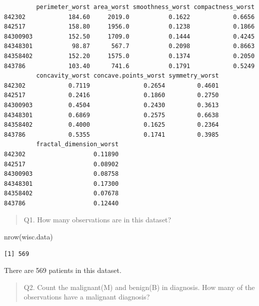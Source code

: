 \documentclass[
  letterpaper,
  DIV=11,
  numbers=noendperiod]{scrartcl}
\newenvironment{Shaded}{\begin{snugshade}}{\end{snugshade}}
\newcommand{\FunctionTok}[1]{\textcolor[rgb]{0.28,0.35,0.67}{#1}}
\newcommand{\NormalTok}[1]{\textcolor[rgb]{0.00,0.23,0.31}{#1}}
\newcommand{\SpecialCharTok}[1]{\textcolor[rgb]{0.37,0.37,0.37}{#1}}
\begin{document}
\begin{verbatim}
         perimeter_worst area_worst smoothness_worst compactness_worst
842302            184.60     2019.0           0.1622            0.6656
842517            158.80     1956.0           0.1238            0.1866
84300903          152.50     1709.0           0.1444            0.4245
84348301           98.87      567.7           0.2098            0.8663
84358402          152.20     1575.0           0.1374            0.2050
843786            103.40      741.6           0.1791            0.5249
         concavity_worst concave.points_worst symmetry_worst
842302            0.7119               0.2654         0.4601
842517            0.2416               0.1860         0.2750
84300903          0.4504               0.2430         0.3613
84348301          0.6869               0.2575         0.6638
84358402          0.4000               0.1625         0.2364
843786            0.5355               0.1741         0.3985
         fractal_dimension_worst
842302                   0.11890
842517                   0.08902
84300903                 0.08758
84348301                 0.17300
84358402                 0.07678
843786                   0.12440
\end{verbatim}

\begin{quote}
Q1. How many observations are in this dataset?
\end{quote}

\begin{Shaded}
\begin{Highlighting}[]
\FunctionTok{nrow}\NormalTok{(wisc.data)}
\end{Highlighting}
\end{Shaded}

\begin{verbatim}
[1] 569
\end{verbatim}

There are 569 patients in this dataset.

\begin{quote}
Q2. Count the malignant(M) and benign(B) in diagnosis. How many of the
observations have a malignant diagnosis?
\end{quote}

\begin{Shaded}
\end{Shaded}
\end{document}
